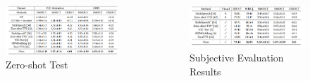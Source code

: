 \begin{frame}
\begin{itemize}
\begin{columns}[T]
    \begin{figure}[H]
        \centering
        \includegraphics[width=\linewidth]{figs/table3.png} %
        \caption{Zero-shot Test}
        \label{fig:zeroshot}
    \end{figure}

    \begin{figure}[H]
        \centering
        \includegraphics[width=\linewidth]{figs/table4.png} %
        \caption{Subjective Evaluation Results}
        \label{fig:subjective}
    \end{figure}
\end{columns}
\end{itemize}
\end{frame}



